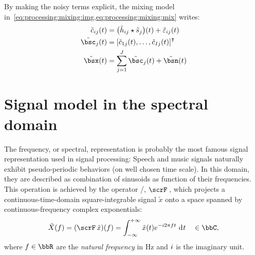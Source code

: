 \mynewline
By making the noisy terms explicit, the mixing model in~\cref{eq:processing:mixing:img,eq:processing:mixing:mix} writes:
\begin{align}
    \tilde{\img}_{\idxMicSrc}(t) &=  \kparen{\tilde{\rir}_{\idxMicSrc} \convCont \tilde{\src}_\idxSrc} (t) +  \tilde{\varepsilon}_{\idxMicSrc}(t)\\
    \tilde{\imgs}_\idxSrc(t)         &= \ktranspose{\klist{\tilde{\img}_{1\idxSrc}(t), \dots, \tilde{\img}_{\numMics\idxSrc}(t)}} \nonumber\\
    \tilde{\mics}(t)                 &= \sum_{\idxSrc=1}^{\numSrcs} \tilde{\imgs}_\idxSrc(t) + \tilde{\bsn}( t)
\end{align}

\section{Signal model in the spectral domain}\label{sec:processing:domains}%
The frequency, or spectral, representation is probably the most famous signal representation used in signal processing:
Speech and music signals naturally exhibit pseudo-periodic behaviors (on well chosen time scale).
In this domain, they are described as combination of sinusoids as function of their frequencies.
\\This operation is achieved by the operator \FTdef/, $\fourierTrans{}$, which projects a continuous-time-domain square-integrable signal $\tilde{x}$ onto a space spanned by continuous-frequency complex exponentials:
\begin{equation}\label{eq:processing:ft}
    \tilde{X}(f) = (\fourierTrans{\tilde{x}})(f) =
        \int_{-\infty}^{+\infty}
        \tilde{x}(t)
        \cste^{-\csti 2 \pi f t}
        \,\kdiff{t} \quad \in \bbC
    ,
\end{equation}
where $f \in \bbR$ are the \textit{natural frequency} in $\si{\Hz}$ and ${i}$ is the imaginary unit.
